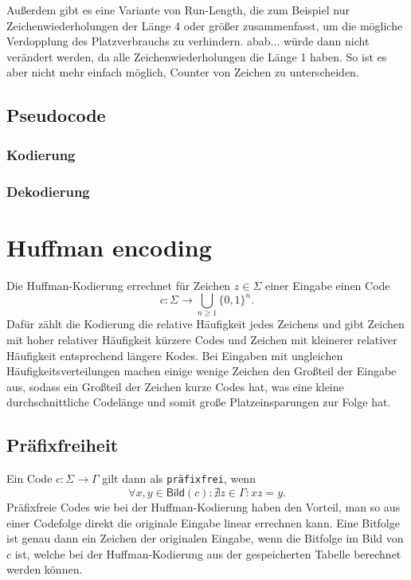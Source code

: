 \documentclass{article}
\begin{document}
Außerdem gibt es eine Variante von Run-Length, die zum Beispiel nur Zeichenwiederholungen der Länge 4 oder größer 
zusammenfasst, um die mögliche Verdopplung des Platzverbrauchs zu verhindern. 
\textsf{abab}$\dots$ würde dann nicht verändert werden, da alle Zeichenwiederholungen die Länge 1 haben.
So ist es aber nicht mehr einfach möglich, Counter von Zeichen zu unterscheiden.
\newpage
\subsection{Pseudocode}
\subsubsection{Kodierung}

\subsubsection{Dekodierung}

\newpage
\section{Huffman encoding}
Die Huffman-Kodierung errechnet für Zeichen $z \in \Sigma$ einer Eingabe einen Code 
\[c: \Sigma \to \bigcup\limits_{n\geq1} \{0,1\}^n.\]
Dafür zählt die Kodierung die relative Häufigkeit jedes Zeichens und 
gibt Zeichen mit hoher relativer Häufigkeit kürzere Codes und Zeichen mit kleinerer relativer Häufigkeit
entsprechend längere Kodes. Bei Eingaben mit ungleichen Häufigkeitsverteilungen machen
einige wenige Zeichen den Großteil der Eingabe aus, sodass ein Großteil
der Zeichen kurze Codes hat, was eine kleine durchschnittliche Codelänge und
somit große Platzeinsparungen zur Folge hat.
\subsection{Präfixfreiheit}
Ein Code $c: \Sigma \to \Gamma$ gilt dann als \texttt{präfixfrei}, wenn
\[\forall x, y \in\textsf{Bild}(c) : \nexists z \in\Gamma : xz = y.\] 
Präfixfreie Codes wie bei der Huffman-Kodierung haben den Vorteil, 
man so aus einer Codefolge direkt die 
originale Eingabe linear errechnen kann. Eine Bitfolge ist genau dann ein Zeichen 
der originalen Eingabe, wenn die Bitfolge im Bild von $c$ ist, welche bei der 
Huffman-Kodierung aus der gespeicherten Tabelle berechnet werden können.
\end{document}
